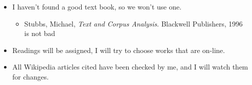 \documentclass[a4paper,landscape,headrule,footrule,xetex]{foils}
\begin{document}




\begin{itemize}
\item I haven't found a good text book, so we won't use one.
  \begin{itemize}
  \item Stubbs, Michael, \textit{Text and Corpus Analysis}. Blackwell Publishers, 1996
\\ is not bad
  \end{itemize}
\item Readings will be assigned, I will try to choose
  works that are on-line.
\item All Wikipedia articles cited have been checked by me, and I will watch
  them for changes. 
\end{itemize}








\end{document}
